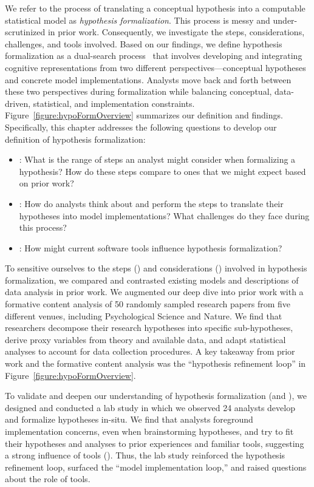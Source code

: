 We refer to the process of translating a conceptual hypothesis into a computable
statistical model as \textit{hypothesis formalization}. This process is  messy
and under-scrutinized in prior work. Consequently, we investigate the steps,
considerations, challenges, and tools involved. Based on our findings, we define
hypothesis formalization as a dual-search process~\cite{klahr1988dual} that
involves developing and integrating cognitive representations from two different
perspectives---conceptual hypotheses and concrete model implementations.
Analysts move back and forth between these two perspectives during formalization
while balancing conceptual, data-driven, statistical, and implementation
constraints. Figure~\ref{figure:hypoFormOverview} summarizes our definition and
findings. Specifically, this chapter addresses the following questions to
develop our definition of hypothesis formalization:
\begin{itemize}
    \item \rqSteps: What is the range of steps an analyst might consider when
    formalizing a hypothesis? How do these steps compare to ones that we might
    expect based on prior work?
    \item \rqProcess: How do analysts think about and perform the steps to
    translate their hypotheses into model implementations? What challenges do
    they face during this process?
    \item \rqTools: How might current software tools influence hypothesis
    formalization?
\end{itemize}

To sensitive ourselves to the steps (\rqSteps) and considerations (\rqProcess)
involved in hypothesis formalization, we compared and contrasted existing models
and descriptions of data analysis in prior work. We augmented our deep dive into
prior work with a formative content analysis of 50 randomly sampled research
papers from five different venues, including Psychological Science and Nature.
We find that researchers decompose their research hypotheses into specific
sub-hypotheses, derive proxy variables from theory and available data, and adapt
statistical analyses to account for data collection procedures. A key takeaway
from prior work and the formative content analysis was the ``hypothesis
refinement loop'' in Figure~\ref{figure:hypoFormOverview}. 

\figureOverivew

To validate and deepen our understanding of
hypothesis formalization (\rqSteps and \rqProcess), we designed and conducted a
lab study in which we observed 24 analysts develop and formalize hypotheses
in-situ. We find that analysts foreground implementation concerns, even when
brainstorming hypotheses, and try to fit their hypotheses and analyses to prior
experiences and familiar tools, suggesting a strong influence of tools
(\rqTools). Thus, the lab study reinforced the hypothesis refinement loop,
surfaced the ``model implementation loop,'' and raised questions about the role
of tools. 

